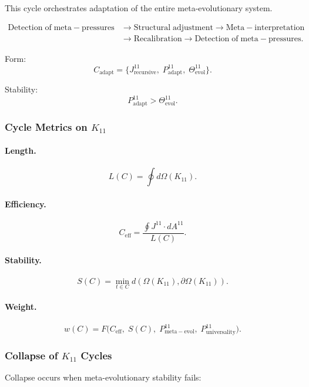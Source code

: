 This cycle orchestrates adaptation of the entire meta-evolutionary system.

\[
  \begin{aligned}
  \mathrm{Detection\;of\;meta\!-\!pressures}
  &\to \mathrm{Structural\;adjustment}
  \to \mathrm{Meta\!-\!interpretation}\\
  &\to \mathrm{Recalibration}
  \to \mathrm{Detection\;of\;meta\!-\!pressures}.
  \end{aligned}
\]

Form:
\[
  C_{\mathrm{adapt}}
  =
  \{
    J^{11}_{\mathrm{recursive}},\;
    P^{11}_{\mathrm{adapt}},\;
    \Theta^{11}_{\mathrm{evol}}
  \}.
\]

Stability:
\[
  P^{11}_{\mathrm{adapt}}>\Theta^{11}_{\mathrm{evol}}.
\]


\subsubsection{Cycle Metrics on $K_{11}$}

\paragraph{Length.}
\[
  L(C)=\oint d\Omega(K_{11}).
\]

\paragraph{Efficiency.}
\[
  C_{\mathrm{eff}}
  =\frac{\oint J^{11}\cdot dA^{11}}{L(C)}.
\]

\paragraph{Stability.}
\[
  S(C)
  =\min_{t\in C} d(\Omega(K_{11}),\partial\Omega(K_{11})).
\]

\paragraph{Weight.}
\[
  w(C)
  =F\!\big(
        C_{\mathrm{eff}},\;
        S(C),\;
        P^{11}_{\mathrm{meta\!-\!evol}},\;
        P^{11}_{\mathrm{universality}}
      \big).
\]


\subsubsection{Collapse of $K_{11}$ Cycles}

Collapse occurs when meta-evolutionary stability fails:


